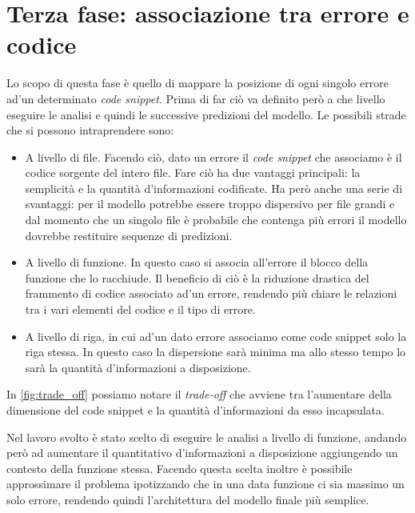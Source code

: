 \section{Terza fase: associazione tra errore e codice}
Lo scopo di questa fase è quello di mappare la posizione di ogni singolo errore ad'un determinato \textit{code snippet}. 
Prima di far ciò va definito però a che livello eseguire le analisi e quindi le successive predizioni del modello.
Le possibili strade che si possono intraprendere sono:
  \begin{itemize}
    \item A livello di file. Facendo ciò, dato un errore il \textit{code snippet} che associamo è il codice sorgente del intero file. 
          Fare ciò ha due vantaggi principali: la semplicità e la quantità d'informazioni codificate. 
          Ha però anche una serie di svantaggi: per il modello potrebbe essere troppo dispersivo per file grandi e dal momento che un singolo file è probabile che contenga più errori il modello dovrebbe restituire sequenze di predizioni.
    \item A livello di funzione. In questo caso si associa all'errore il blocco della funzione che lo racchiude.
          Il beneficio di ciò è la riduzione drastica del frammento di codice associato ad'un errore, rendendo più chiare le relazioni tra i vari elementi del codice e il tipo di errore.
    \item A livello di riga, in cui ad'un dato errore associamo come code snippet solo la riga stessa. In questo caso la dispersione sarà minima ma allo stesso tempo lo sarà la quantità d'informazioni a disposizione.
  \end{itemize}

In \autoref{fig:trade_off} possiamo notare il \textit{trade-off} che avviene tra l'aumentare della dimensione del code snippet e la quantità d'informazioni da esso incapsulata. 

Nel lavoro svolto è stato scelto di eseguire le analisi a livello di funzione, andando però ad aumentare il quantitativo d'informazioni a disposizione aggiungendo un contesto della funzione stessa. 
Facendo questa scelta inoltre è possibile approssimare il problema ipotizzando che in una data funzione ci sia massimo un solo errore, rendendo quindi l'architettura del modello finale più semplice.

